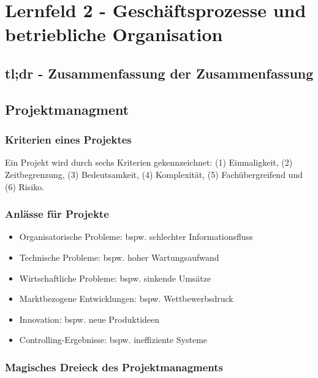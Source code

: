 \section{Lernfeld 2 - Geschäftsprozesse und betriebliche Organisation}

\subsection{tl;dr - Zusammenfassung der Zusammenfassung}

\subsection{Projektmanagment}

\subsubsection{Kriterien eines Projektes}

Ein Projekt wird durch sechs Kriterien gekennzeichnet: (1) Einmaligkeit, (2) Zeitbegrenzung, (3) Bedeutsamkeit, (4) Komplexität, (5) Fachübergreifend und (6) Risiko.

\subsubsection{Anlässe für Projekte}
\begin{itemize}
	\item Organisatorische Probleme: bspw. schlechter Informationsfluss
	\item Technische Probleme: bspw. hoher Wartungsaufwand
	\item Wirtschaftliche Probleme: bspw. sinkende Umsätze
	\item Marktbezogene Entwicklungen: bspw. Wettbewerbsdruck
	\item Innovation: bspw. neue Produktideen
	\item Controlling-Ergebnisse: bspw. ineffiziente Systeme
\end{itemize}

\subsubsection{Magisches Dreieck des Projektmanagments}

